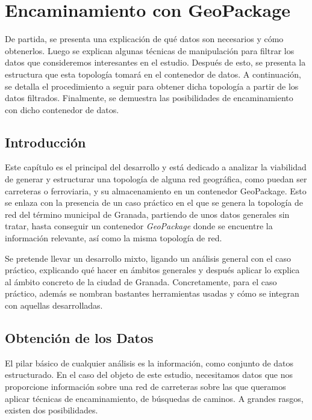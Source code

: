 \chapter{Encaminamiento con GeoPackage}
\label{ch:geopackage_routing}

\begin{chapsummary}
	De partida, se presenta una explicación de qué datos son necesarios y cómo obtenerlos. Luego se explican algunas técnicas de manipulación para filtrar los datos que consideremos interesantes en el estudio. Después de esto, se presenta la estructura que esta topología tomará en el contenedor de datos. A continuación, se detalla el procedimiento a seguir para obtener dicha topología a partir de los datos filtrados. Finalmente, se demuestra las posibilidades de encaminamiento con dicho contenedor de datos.
\end{chapsummary}

\section*{Introducción}
Este capítulo es el principal del desarrollo y está dedicado a analizar la viabilidad de generar y estructurar una topología de alguna red geográfica, como puedan ser carreteras o ferroviaria, y su almacenamiento en un contenedor GeoPackage. Esto se enlaza con la presencia de un caso práctico en el que se genera la topología de red del término municipal de Granada, partiendo de unos datos generales sin tratar, hasta conseguir un contenedor \textit{GeoPackage} donde se encuentre la información relevante, así como la misma topología de red.

Se pretende llevar un desarrollo mixto, ligando un análisis general con el caso práctico, explicando qué hacer en ámbitos generales y después aplicar lo explica al ámbito concreto de la ciudad de Granada. Concretamente, para el caso práctico, además se nombran bastantes herramientas usadas y cómo se integran con aquellas desarrolladas.

\section{Obtención de los Datos}
	El pilar básico de cualquier análisis es la información, como conjunto de datos estructurado. En el caso del objeto de este estudio, necesitamos datos que nos proporcione información sobre una red de carreteras sobre las que queramos aplicar técnicas de encaminamiento, de búsquedas de caminos. A grandes rasgos, existen dos posibilidades. 
	
